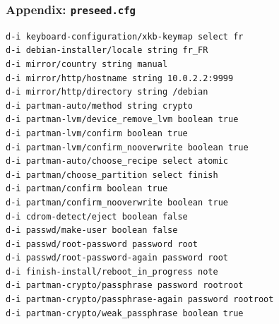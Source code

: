 \documentclass[handout]{beamer}
\begin{document}
\begin{frame}[fragile]
  \frametitle{Appendix: \texttt{preseed.cfg}}

  \begin{lstlisting}[basicstyle=\tiny]
d-i keyboard-configuration/xkb-keymap select fr
d-i debian-installer/locale string fr_FR
d-i mirror/country string manual
d-i mirror/http/hostname string 10.0.2.2:9999
d-i mirror/http/directory string /debian
d-i partman-auto/method string crypto
d-i partman-lvm/device_remove_lvm boolean true
d-i partman-lvm/confirm boolean true
d-i partman-lvm/confirm_nooverwrite boolean true
d-i partman-auto/choose_recipe select atomic
d-i partman/choose_partition select finish
d-i partman/confirm boolean true
d-i partman/confirm_nooverwrite boolean true
d-i cdrom-detect/eject boolean false
d-i passwd/make-user boolean false
d-i passwd/root-password password root
d-i passwd/root-password-again password root
d-i finish-install/reboot_in_progress note
d-i partman-crypto/passphrase password rootroot
d-i partman-crypto/passphrase-again password rootroot
d-i partman-crypto/weak_passphrase boolean true
  \end{lstlisting}
\end{frame}
\end{document}
